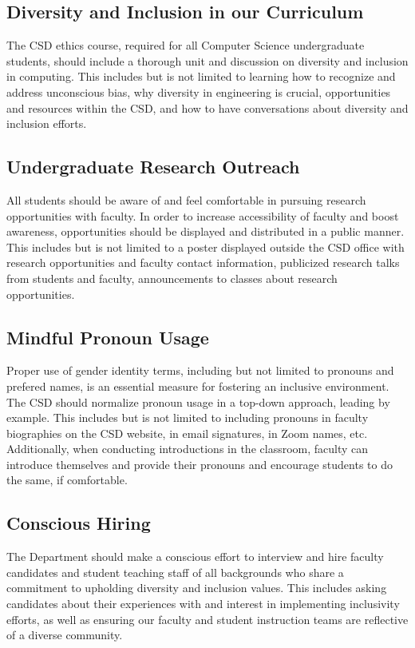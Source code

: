 \documentclass{article}
\begin{document}
\subsection{Diversity and Inclusion in our Curriculum} 
The CSD ethics course, required for all Computer Science undergraduate students, 
should include a thorough unit and discussion on diversity and inclusion in computing. 
This includes but is not limited to learning how to recognize and address unconscious bias, why diversity in 
engineering is crucial, opportunities and resources within the CSD, and how to have conversations about diversity 
and inclusion efforts.

\subsection{Undergraduate Research Outreach} 
All students should be aware of and feel comfortable in pursuing 
research opportunities with faculty. In order to increase accessibility of faculty and boost awareness, 
opportunities should be displayed and distributed in a public manner. This includes but is not limited to a poster 
displayed outside the CSD office with research opportunities and faculty contact information, publicized research 
talks from students and faculty, announcements to classes about research opportunities.

\subsection{Mindful Pronoun Usage} 
Proper use of gender identity terms, including but not limited to pronouns and prefered names, 
is an essential measure for fostering an inclusive environment. The CSD should normalize pronoun usage in a 
top-down approach, leading by example. This includes but is not limited to including pronouns in faculty biographies 
on the CSD website, in email signatures, in Zoom names, etc. Additionally, when conducting introductions in the 
classroom, faculty can introduce themselves and provide their pronouns and encourage students to do the same, if 
comfortable.

\subsection{Conscious Hiring} 
The Department should make a conscious effort to interview and hire faculty candidates and 
student teaching staff of all backgrounds who share a commitment to upholding diversity and inclusion values. 
This includes asking candidates about their experiences with and interest in implementing inclusivity efforts, as well 
as ensuring our faculty and student instruction teams are reflective of a diverse community.
\end{document}
